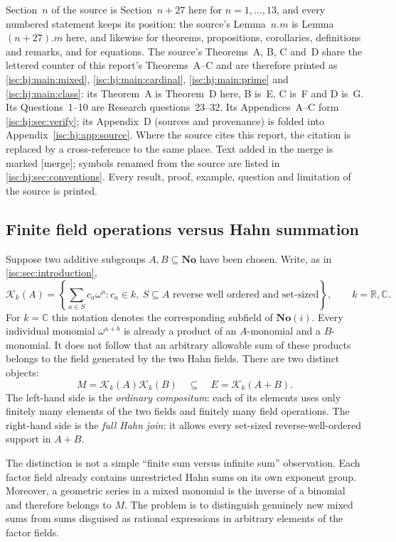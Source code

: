 \documentclass[11pt,letterpaper]{article}
\theoremstyle{definition}
\theoremstyle{remark}
\newcommand{\No}{\mathbf{No}}
\newcommand{\R}{\mathbb R}
\newcommand{\C}{\mathbb C}
\newcommand{\K}[2]{\mathcal K_{#1}(#2)}
\newcommand{\mtag}{\textup{[merge]}}%
\numberwithin{equation}{section}
\begin{document}
Section~$n$ of the source is Section~$n+27$ here for $n=1,\ldots,13$, and
every numbered statement keeps its position: the source's Lemma~$n.m$ is
Lemma~$(n+27).m$ here, and likewise for theorems, propositions,
corollaries, definitions and remarks, and for equations. The source's
Theorems~A, B, C and~D share the lettered counter of this report's
Theorems~A--C and are therefore printed as \cref{isc:hj:main:mixed},
\cref{isc:hj:main:cardinal}, \cref{isc:hj:main:prime} and
\cref{isc:hj:main:class}: its Theorem~A is Theorem~D here, B is~E, C is~F
and D is~G. Its Questions~1--10 are Research questions~23--32. Its
Appendices~A--C form \cref{isc:hj:sec:verify}; its Appendix~D (sources and
provenance) is folded into Appendix~\ref{isc:hj:app:source}. Where the
source cites this report, the citation is replaced by a cross-reference to
the same place. Text added in the merge is marked \mtag; symbols renamed from
the source are listed in \cref{isc:hj:sec:conventions}. Every result, proof,
example, question and limitation of the source is printed.

\subsection{Finite field operations versus Hahn summation}

Suppose two additive subgroups $A,B\subseteq\No$ have been chosen. Write,
as in \cref{isc:sec:introduction},
\[
 \K{k}{A}=\left\{\sum_{a\in S}c_a\omega^a:
 c_a\in k,\ S\subseteq A\text{ reverse well ordered and set-sized}\right\},
 \qquad k=\R,\C.
\]
For $k=\C$ this notation denotes the corresponding subfield of $\No(i)$.
Every individual monomial $\omega^{a+b}$ is already a product of an
$A$-monomial and a $B$-monomial. It does not follow that an arbitrary
allowable sum of these products belongs to the field generated by the two
Hahn fields. There are two distinct objects:
\begin{equation}\label{isc:hj:eq:twoobjects}
 M=\K{k}{A}\K{k}{B}
 \quad\subseteq\quad
 E=\K{k}{A+B}.
\end{equation}
The left-hand side is the \emph{ordinary compositum}: each of its elements
uses only finitely many elements of the two fields and finitely many field
operations. The right-hand side is the \emph{full Hahn join}: it allows
every set-sized reverse-well-ordered support in $A+B$.

The distinction is not a simple ``finite sum versus infinite sum''
observation. Each factor field already contains unrestricted Hahn sums on
its own exponent group. Moreover, a geometric series in a mixed monomial
is the inverse of a binomial and therefore belongs to $M$. The problem is
to distinguish genuinely new mixed sums from sums disguised as rational
expressions in arbitrary elements of the factor fields.
\end{document}
